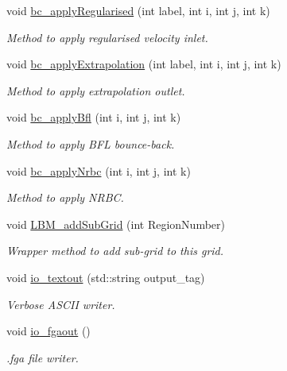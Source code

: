 \begin{DoxyCompactItemize}
void \hyperlink{class_grid_obj_a5602705b2575b09e27dd0065de3542f6}{bc\+\_\+apply\+Regularised} (int label, int i, int j, int k)
\begin{DoxyCompactList}\small\item\em Method to apply regularised velocity inlet. \end{DoxyCompactList}\item 
void \hyperlink{class_grid_obj_a385c4803f4803e380a520ac9b3dcb31d}{bc\+\_\+apply\+Extrapolation} (int label, int i, int j, int k)
\begin{DoxyCompactList}\small\item\em Method to apply extrapolation outlet. \end{DoxyCompactList}\item 
void \hyperlink{class_grid_obj_aeff3b54617b7ae65f08c96e653f9035f}{bc\+\_\+apply\+Bfl} (int i, int j, int k)
\begin{DoxyCompactList}\small\item\em Method to apply B\+FL bounce-\/back. \end{DoxyCompactList}\item 
void \hyperlink{class_grid_obj_ae4fd999e7334c8ec8e1118c92e0c7338}{bc\+\_\+apply\+Nrbc} (int i, int j, int k)
\begin{DoxyCompactList}\small\item\em Method to apply N\+R\+BC. \end{DoxyCompactList}\item 
void \hyperlink{class_grid_obj_ab0d47be7ccafaa84b5d43da69e2082b9}{L\+B\+M\+\_\+add\+Sub\+Grid} (int Region\+Number)
\begin{DoxyCompactList}\small\item\em Wrapper method to add sub-\/grid to this grid. \end{DoxyCompactList}\item 
void \hyperlink{class_grid_obj_a1f334215b7789ea1ad8e2d1e15c67fb2}{io\+\_\+textout} (std\+::string output\+\_\+tag)
\begin{DoxyCompactList}\small\item\em Verbose A\+S\+C\+II writer. \end{DoxyCompactList}\item 
void \hyperlink{class_grid_obj_aa80aecb06d7a420865c32b8acc15581e}{io\+\_\+fgaout} ()
\begin{DoxyCompactList}\small\item\em .fga file writer. \end{DoxyCompactList}\item 

\end{DoxyCompactItemize}
